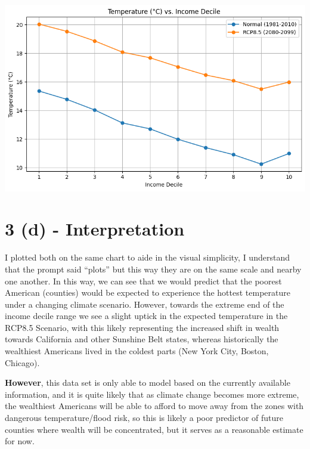 \documentclass[
  letterpaper,
  DIV=11,
  numbers=noendperiod]{scrartcl}
\begin{document}
\includegraphics{Assignment-1_ICP_files/figure-pdf/cell-9-output-1.png}

\section{3 (d) - Interpretation}\label{d---interpretation}

I plotted both on the same chart to aide in the visual simplicity, I
understand that the prompt said ``plots'' but this way they are on the
same scale and nearby one another. In this way, we can see that we would
predict that the poorest American (counties) would be expected to
experience the hottest temperature under a changing climate scenario.
However, towards the extreme end of the income decile range we see a
slight uptick in the expected temperature in the RCP8.5 Scenario, with
this likely representing the increased shift in wealth towards
California and other Sunshine Belt states, whereas historically the
wealthiest Americans lived in the coldest parts (New York City, Boston,
Chicago).

\textbf{However}, this data set is only able to model based on the
currently available information, and it is quite likely that as climate
change becomes more extreme, the wealthiest Americans will be able to
afford to move away from the zones with dangerous temperature/flood
risk, so this is likely a poor predictor of future counties where wealth
will be concentrated, but it serves as a reasonable estimate for now.
\end{document}

